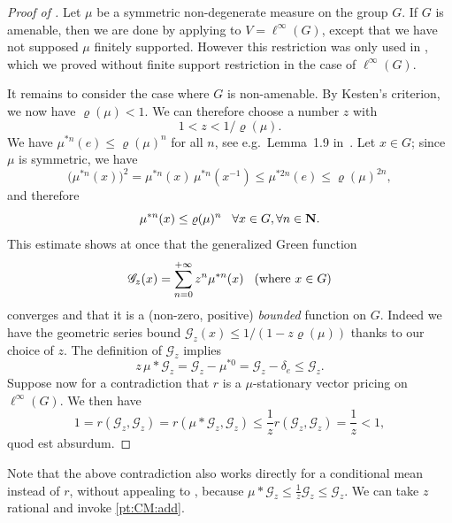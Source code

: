 \documentclass[11pt]{amsart}
\numberwithin{equation}{section}
\theoremstyle{definition}
\theoremstyle{definition}
\newcommand*{\NN}{\mathbf{N}}
\newcommand*{\inv}{^{-1}}
\newcommand*{\green}{\mathscr{G}}
\begin{document}
\begin{proof}[Proof of ]
Let $\mu$ be a symmetric non-degenerate measure on the group $G$. If $G$ is amenable, then we are done by applying  to $V=\ell^\infty(G)$, except that we have not supposed $\mu$ finitely supported. However this restriction was only used in , which we proved without finite support restriction in the case of $\ell^\infty(G)$.

It remains to consider the case where $G$ is non-amenable. By Kesten's criterion, we now have $\varrho(\mu)<1$. We can therefore choose a number $z$ with
\begin{equation*}
1 < z < 1/\varrho(\mu).
\end{equation*}
We have  $\mu^{*n} (e) \leq \varrho(\mu)^n$ for all $n$, see e.g.\ Lemma~1.9 in~\cite{Woess_book}. Let $x\in G$; since $\mu$ is symmetric, we have
\begin{equation*}
\big(\mu^{*n} (x)\big)^2 = \mu^{*n} (x)\, \mu^{*n} (x\inv) \leq \mu^{*2n} (e) \leq \varrho(\mu)^{2n},
\end{equation*}
and therefore
\begin{equation*}
\mu^{*n} (x) \leq \varrho(\mu)^n  \kern3mm \forall x\in G, \forall n\in \NN.
\end{equation*}
This estimate shows at once that the generalized Green function
\begin{equation*}
\green_z(x) = \sum_{n=0}^{+\infty} z^n \mu^{*n}(x) \kern3mm (\text{where } x\in G)
\end{equation*}
converges and that it is a (non-zero, positive) \emph{bounded} function on $G$. Indeed we have the geometric series bound $\green_z(x) \leq 1/(1-z \varrho(\mu) )$ thanks to our choice of $z$. The definition of $\green_z$ implies
\begin{equation*}
z \,\mu * \green_z = \green_z - \mu^{*0} =\green_z - \delta_e
\leq \green_z.
\end{equation*}
Suppose now for a contradiction that $r$ is a $\mu$-stationary vector pricing on $\ell^\infty(G)$. We then have
\begin{equation*}
1 = r(\green_z, \green_z) =  r(\mu* \green_z, \green_z) \leq \frac1z  r(\green_z, \green_z) = \frac1z < 1,
\end{equation*}
quod est absurdum.
\end{proof}

Note that the above contradiction also works directly for a conditional mean instead of $r$, without appealing to , because $\mu* \green_z \leq \frac1z  \green_z \leq \green_z$. We can take $z$ rational and invoke \ref{pt:CM:add}.
\end{document}

